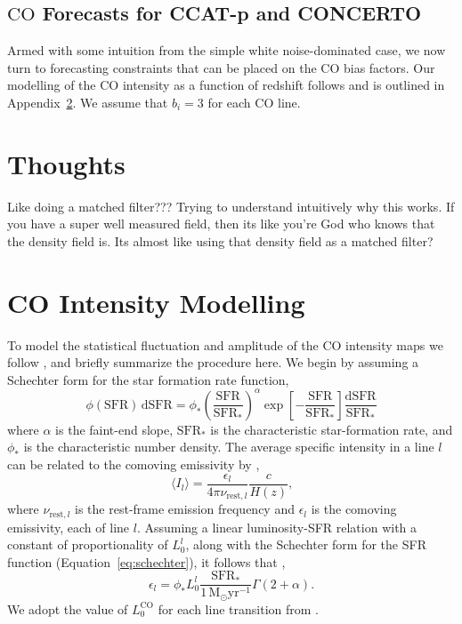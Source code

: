\documentclass{aastex62}
\newcommand{\Msun}{\ensuremath{\text{M}_\odot}}
\newcommand{\SFR}{\ensuremath{\text{SFR}}}
\newcommand{\CO}{\ensuremath{\text{CO}}}
\newcommand{\beq}{\begin{equation}}
\newcommand{\eeq}{\end{equation}}
\newcommand{\avg}[1]{\ensuremath{\langle #1 \rangle}}
\begin{document}
\subsection{\CO{} Forecasts for CCAT-p and CONCERTO} \label{ssec:forecasts_tf}
Armed with some intuition from the simple white noise-dominated case, we now
turn to forecasting constraints that can be placed on the CO bias factors. Our
modelling of the \CO{} intensity as a function of redshift follows
\citet{2016ApJ...825..143L} and is outlined in Appendix~\ref{app:co_int}. We
assume that $b_i=3$ for each \CO{} line.

\section{Thoughts}
Like doing a matched filter??? Trying to understand intuitively why this
works. If you have a super well measured field, then its like you're God who
knows that the density field is. Its almost like using that density field as a
matched filter?

\appendix
\section{CO Intensity Modelling} \label{app:co_int}
To model the statistical fluctuation and amplitude of the \CO{} intensity maps
we follow \citet{2016ApJ...825..143L}, and briefly summarize the procedure
here. We begin by assuming a Schechter form for the star formation rate
function,
\beq\label{eq:schechter}
\phi(\SFR)\,\text{d}\SFR = \phi_*
\left(\frac{\SFR}{\SFR_*}\right)^{\alpha}\exp{\left[-\frac{\SFR}{\SFR_*}\right]}
\frac{\text{d}\SFR}{\SFR_*}
\eeq
where $\alpha$ is the faint-end slope, $\SFR_*$ is the characteristic
star-formation rate, and $\phi_*$ is the characteristic number density. The
average specific intensity in a line $l$ can be related to the comoving
emissivity by \citep{2011ApJ...741...70L, 2013ApJ...768...15P},
\beq\label{eq:emiss_to_int}
\avg{I_l} = \frac{\epsilon_l}{4\pi \nu_{\text{rest},l}}\frac{c}{H(z)}\text{,}
\eeq
where $\nu_{\text{rest},l}$ is the rest-frame emission frequency and
$\epsilon_l$ is the comoving emissivity, each of line $l$. Assuming a linear
luminosity-SFR relation with a constant of proportionality of $L_0^l$, along
with the Schechter form for the SFR function (Equation~\ref{eq:schechter}), it
follows that \citep{2013ApJ...768...15P},
\beq\label{eq:com_emiss}
\epsilon_l = \phi_* L_0^{l}
\frac{\SFR_*}{1\,\Msun\text{yr}^{-1}}\Gamma{(2+\alpha)}\text{.}
\eeq
We adopt the value of $L_0^{\CO}$ for each line transition from
\citet{2010JCAP...11..016V}.



\end{document}
